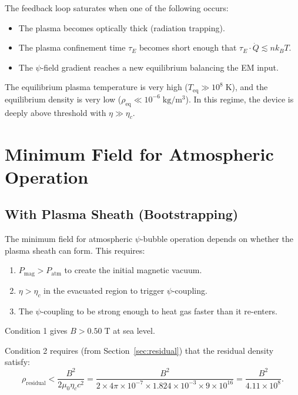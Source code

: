 \documentclass[11pt,a4paper]{article}
\begin{document}
The feedback loop saturates when one of the following occurs:
\begin{itemize}
\item The plasma becomes optically thick (radiation trapping).
\item The plasma confinement time $\tau_E$ becomes short enough that
$\tau_E \cdot \dot{Q} \lesssim n k_B T$.
\item The $\psi$-field gradient reaches a new equilibrium balancing the EM input.
\end{itemize}

The equilibrium plasma temperature is very high ($T_{\mathrm{eq}} \gg 10^8\;\mathrm{K}$),
and the equilibrium density is very low ($\rho_{\mathrm{eq}} \ll 10^{-6}\;\mathrm{kg/m^3}$).
In this regime, the device is deeply above threshold with $\eta \gg \eta_c$.

\section{Minimum Field for Atmospheric Operation}\label{sec:minimum}

\subsection{With Plasma Sheath (Bootstrapping)}

The minimum field for atmospheric $\psi$-bubble operation depends on whether the
plasma sheath can form. This requires:

\begin{enumerate}
\item $P_{\mathrm{mag}} > P_{\mathrm{atm}}$ to create the initial magnetic vacuum.
\item $\eta > \eta_c$ in the evacuated region to trigger $\psi$-coupling.
\item The $\psi$-coupling to be strong enough to heat gas faster than it re-enters.
\end{enumerate}

Condition 1 gives $B > 0.50\;\mathrm{T}$ at sea level.

Condition 2 requires (from Section~\ref{sec:residual}) that the residual density
satisfy:
\begin{equation}
\rho_{\mathrm{residual}} < \frac{B^2}{2\mu_0 \eta_c c^2}
= \frac{B^2}{2 \times 4\pi \times 10^{-7} \times 1.824 \times 10^{-3} \times 9 \times 10^{16}}
= \frac{B^2}{4.11 \times 10^8}.
\end{equation}
\end{document}
